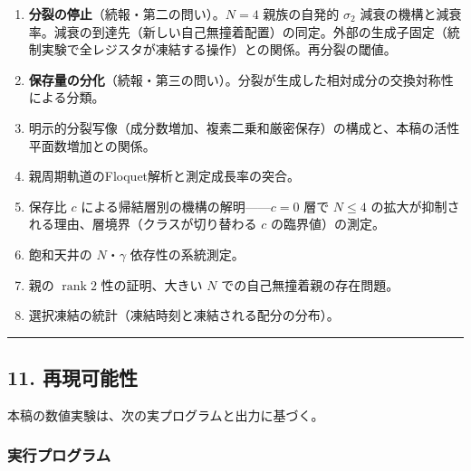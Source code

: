 \documentclass[
  a4paper,
]{ltjsarticle}
\providecommand{\tightlist}{%
  \setlength{\itemsep}{0pt}\setlength{\parskip}{0pt}}
\begin{document}
\begin{enumerate}
\def\labelenumi{\arabic{enumi}.}
\tightlist
\item
  \textbf{分裂の停止}（続報・第二の問い）。\(N=4\) 親族の自発的
  \(\sigma_2\)
  減衰の機構と減衰率。減衰の到達先（新しい自己無撞着配置）の同定。外部の生成子固定（統制実験で全レジスタが凍結する操作）との関係。再分裂の閾値。
\item
  \textbf{保存量の分化}（続報・第三の問い）。分裂が生成した相対成分の交換対称性による分類。
\item
  明示的分裂写像（成分数増加、複素二乗和厳密保存）の構成と、本稿の活性平面数増加との関係。
\item
  親周期軌道のFloquet解析と測定成長率の突合。
\item
  保存比 \(c\) による帰結層別の機構の解明------\(c=0\) 層で \(N\le4\)
  の拡大が抑制される理由、層境界（クラスが切り替わる \(c\)
  の臨界値）の測定。
\item
  飽和天井の \(N\)・\(\gamma\) 依存性の系統測定。
\item
  親の \(\operatorname{rank}2\) 性の証明、大きい \(N\)
  での自己無撞着親の存在問題。
\item
  選択凍結の統計（凍結時刻と凍結される配分の分布）。
\end{enumerate}

\begin{center}\rule{0.5\linewidth}{0.5pt}\end{center}

\subsection{11. 再現可能性}\label{ux518dux73feux53efux80fdux6027}

本稿の数値実験は、次の実プログラムと出力に基づく。

\subsubsection{実行プログラム}\label{ux5b9fux884cux30d7ux30edux30b0ux30e9ux30e0}
\end{document}
